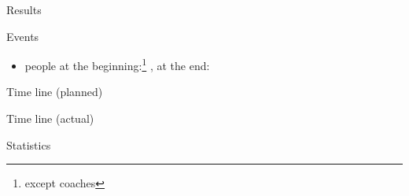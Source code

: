 \begin{myslide}{Results}
  
\end{myslide}



\begin{myslide}{Events}
  \begin{itemize}
  \item people at the beginning:\footnote{except coaches} ,
    at the end: 
  \end{itemize}
\end{myslide}

\begin{myslide}{Time line (planned)}

\end{myslide}
\begin{myslide}{Time line  (actual)}
  
\end{myslide}

\begin{myslide}{Statistics}
  
\end{myslide}




